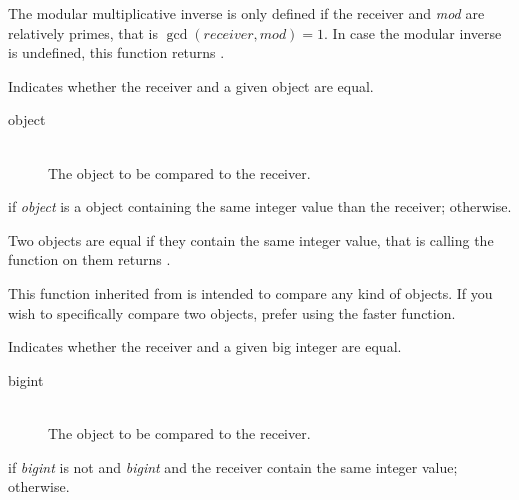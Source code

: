 The modular multiplicative inverse is only defined if the receiver and \emph{mod} are relatively primes, that is $\gcd(receiver, mod) = 1$. In case the modular inverse is undefined, this function returns .



Indicates whether the receiver and a given object are equal.


\docparams

\begin{description}
\item[object] \hfill \\ The object to be compared to the receiver.
\end{description}

\docretval

 if \emph{object} is a  object containing the same integer value than the receiver;   otherwise.

\docdiscuss

Two  objects are equal if they contain the same integer value, that is calling the  function on them returns .

This function inherited from  is intended to compare any kind of objects. If you wish to specifically compare two  objects, prefer using the faster  function.



Indicates whether the receiver and a given big integer are equal.


\docparams

\begin{description}
\item[bigint] \hfill \\ The  object to be compared to the receiver.
\end{description}

\docretval

 if \emph{bigint} is not  and \emph{bigint} and the receiver contain the same integer value;   otherwise.

